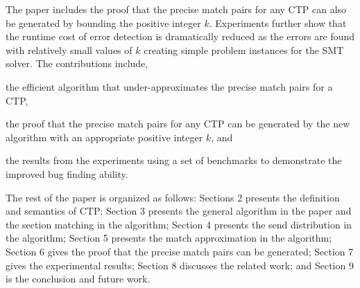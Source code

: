 The paper includes the proof that the precise match pairs for any CTP can also be generated by bounding the positive integer $k$. 
Experiments further show that the runtime cost of error detection is dramatically reduced as the errors are found with relatively small values of $k$ creating simple problem instances for the SMT solver. 
The contributions include,
\begin{compactitem}
\item the efficient algorithm that under-approximates the precise match pairs for a CTP, 
\item the proof that the precise match pairs for any CTP can be generated by the new algorithm with an appropriate positive integer $k$, and
\item the results from the experiments using a set of benchmarks to demonstrate the improved bug finding ability.
\end{compactitem}

The rest of the paper is organized as follows: 
Sections 2 presents the definition and semantics of CTP; Section 3 presents the general algorithm in the paper and the section matching in the algorithm; Section 4 presents the send distribution in the algorithm; Section 5 presents the match approximation in the algorithm; Section 6 gives the proof that the precise match pairs can be generated; Section 7 gives the experimental results; Section 8 discusses the related work; and Section 9 is the conclusion and future work.
